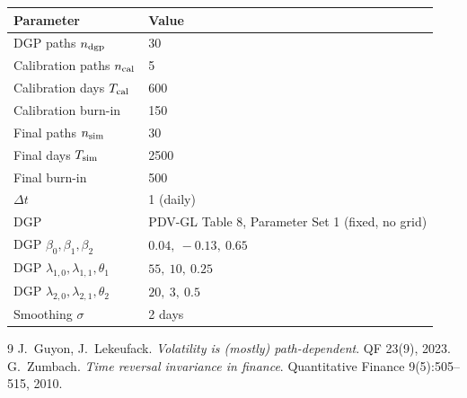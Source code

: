 \documentclass[11pt,a4paper]{article}
\begin{document}
\begin{center}\renewcommand{\arraystretch}{1.4}
\begin{tabular}{ll}\toprule Parameter & Value \\\midrule
DGP paths $n_{\rm dgp}$ & 30 \\
Calibration paths $n_{\rm cal}$ & 5 \\
Calibration days $T_{\rm cal}$ & 600 \\
Calibration burn-in & 150 \\
Final paths $n_{\rm sim}$ & 30 \\
Final days $T_{\rm sim}$ & 2500 \\
Final burn-in & 500 \\
$\Delta t$ & 1 (daily) \\
DGP & PDV-GL Table 8, Parameter Set 1 (fixed, no grid) \\
DGP $\beta_0,\beta_1,\beta_2$ & $0.04,\ -0.13,\ 0.65$ \\
DGP $\lambda_{1,0},\lambda_{1,1},\theta_1$ & $55,\ 10,\ 0.25$ \\
DGP $\lambda_{2,0},\lambda_{2,1},\theta_2$ & $20,\ 3,\ 0.5$ \\
Smoothing $\sigma$ & 2 days \\
\bottomrule\end{tabular}\end{center}

\begin{thebibliography}{9}
 J.\ Guyon, J.\ Lekeufack.
\textit{Volatility is (mostly) path-dependent}. QF 23(9), 2023.
 G.\ Zumbach.
\textit{Time reversal invariance in finance}. Quantitative Finance
9(5):505--515, 2010.
\end{thebibliography}
\end{document}

